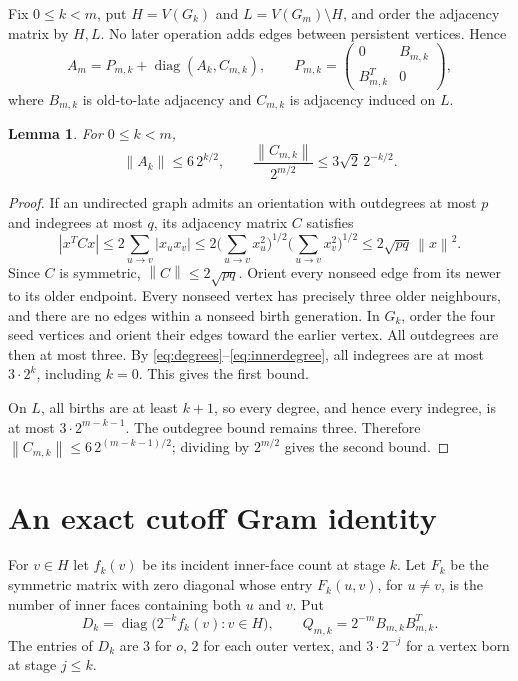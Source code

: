 \documentclass[11pt]{article}
\newtheorem{lemma}[theorem]{Lemma}
\newcommand{\norm}[1]{\left\lVert#1\right\rVert}
\begin{document}
Fix $0\le k<m$, put $H=V(G_k)$ and $L=V(G_m)\setminus H$, and order
the adjacency matrix by $H,L$. No later operation adds edges between
persistent vertices. Hence
\begin{equation}\label{eq:split}
A_m=P_{m,k}+\operatorname{diag}(A_k,C_{m,k}),\qquad
P_{m,k}=\begin{pmatrix}0&B_{m,k}\\B_{m,k}^{T}&0\end{pmatrix},
\end{equation}
where $B_{m,k}$ is old-to-late adjacency and $C_{m,k}$ is adjacency
induced on $L$.

\begin{lemma}\label{lem:norms}
For $0\le k<m$,
\begin{equation}\label{eq:norms}
\norm{A_k}\le6\,2^{k/2},\qquad
\frac{\norm{C_{m,k}}}{2^{m/2}}
\le3\sqrt2\,2^{-k/2}.
\end{equation}
\end{lemma}
\begin{proof}
If an undirected graph admits an orientation with outdegrees at most
$p$ and indegrees at most $q$, its adjacency matrix $C$ satisfies
\[
|x^TCx|\le2\sum_{u\to v}|x_u x_v|
\le2\Big(\sum_{u\to v}x_u^2\Big)^{1/2}
       \Big(\sum_{u\to v}x_v^2\Big)^{1/2}
\le2\sqrt{pq}\,\norm{x}^2.
\]
Since $C$ is symmetric, $\norm{C}\le2\sqrt{pq}$.
Orient every nonseed edge from its newer to its older endpoint.
Every nonseed vertex has precisely three older neighbours, and there
are no edges within a nonseed birth generation.
In $G_k$, order the four seed vertices and orient their edges toward
the earlier vertex. All outdegrees are then at most three. By
\eqref{eq:degrees}--\eqref{eq:innerdegree}, all indegrees are at most
$3\cdot2^k$, including $k=0$. This gives the first bound.

On $L$, all births are at least $k+1$, so every degree, and hence every
indegree, is at most $3\cdot2^{m-k-1}$. The outdegree bound remains
three. Therefore
$\norm{C_{m,k}}\le6\,2^{(m-k-1)/2}$; dividing by $2^{m/2}$ gives
the second bound.
\end{proof}

\section{An exact cutoff Gram identity}
For $v\in H$ let $f_k(v)$ be its incident inner-face count at stage $k$.
Let $F_k$ be the symmetric matrix with zero diagonal whose entry
$F_k(u,v)$, for $u\ne v$, is the number of inner faces containing both
$u$ and $v$. Put
\[
D_k=\operatorname{diag}\bigl(2^{-k}f_k(v):v\in H\bigr),\qquad
Q_{m,k}=2^{-m}B_{m,k}B_{m,k}^T.
\]
The entries of $D_k$ are $3$ for $o$, $2$ for each outer vertex, and
$3\cdot2^{-j}$ for a vertex born at stage $j\le k$.
\end{document}

